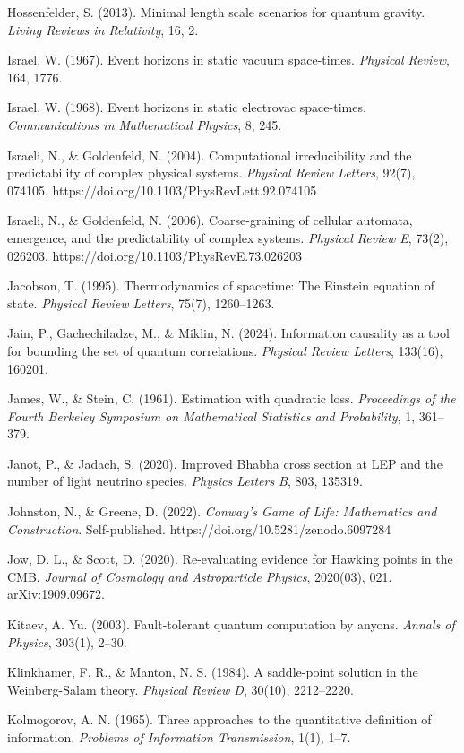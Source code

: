 \documentclass[
]{article}
\begin{document}
Hossenfelder, S. (2013). Minimal length scale scenarios for quantum
gravity. \emph{Living Reviews in Relativity}, 16, 2.

Israel, W. (1967). Event horizons in static vacuum space-times.
\emph{Physical Review}, 164, 1776.

Israel, W. (1968). Event horizons in static electrovac space-times.
\emph{Communications in Mathematical Physics}, 8, 245.

Israeli, N., \& Goldenfeld, N. (2004). Computational irreducibility and
the predictability of complex physical systems. \emph{Physical Review
Letters}, 92(7), 074105. https://doi.org/10.1103/PhysRevLett.92.074105

Israeli, N., \& Goldenfeld, N. (2006). Coarse-graining of cellular
automata, emergence, and the predictability of complex systems.
\emph{Physical Review E}, 73(2), 026203.
https://doi.org/10.1103/PhysRevE.73.026203

Jacobson, T. (1995). Thermodynamics of spacetime: The Einstein equation
of state. \emph{Physical Review Letters}, 75(7), 1260--1263.

Jain, P., Gachechiladze, M., \& Miklin, N. (2024). Information causality
as a tool for bounding the set of quantum correlations. \emph{Physical
Review Letters}, 133(16), 160201.

James, W., \& Stein, C. (1961). Estimation with quadratic loss.
\emph{Proceedings of the Fourth Berkeley Symposium on Mathematical
Statistics and Probability}, 1, 361--379.

Janot, P., \& Jadach, S. (2020). Improved Bhabha cross section at LEP
and the number of light neutrino species. \emph{Physics Letters B}, 803,
135319.

Johnston, N., \& Greene, D. (2022). \emph{Conway's Game of Life:
Mathematics and Construction}. Self-published.
https://doi.org/10.5281/zenodo.6097284

Jow, D. L., \& Scott, D. (2020). Re-evaluating evidence for Hawking
points in the CMB. \emph{Journal of Cosmology and Astroparticle
Physics}, 2020(03), 021. arXiv:1909.09672.

Kitaev, A. Yu. (2003). Fault-tolerant quantum computation by anyons.
\emph{Annals of Physics}, 303(1), 2--30.

Klinkhamer, F. R., \& Manton, N. S. (1984). A saddle-point solution in
the Weinberg-Salam theory. \emph{Physical Review D}, 30(10), 2212--2220.

Kolmogorov, A. N. (1965). Three approaches to the quantitative
definition of information. \emph{Problems of Information Transmission},
1(1), 1--7.
\end{document}
